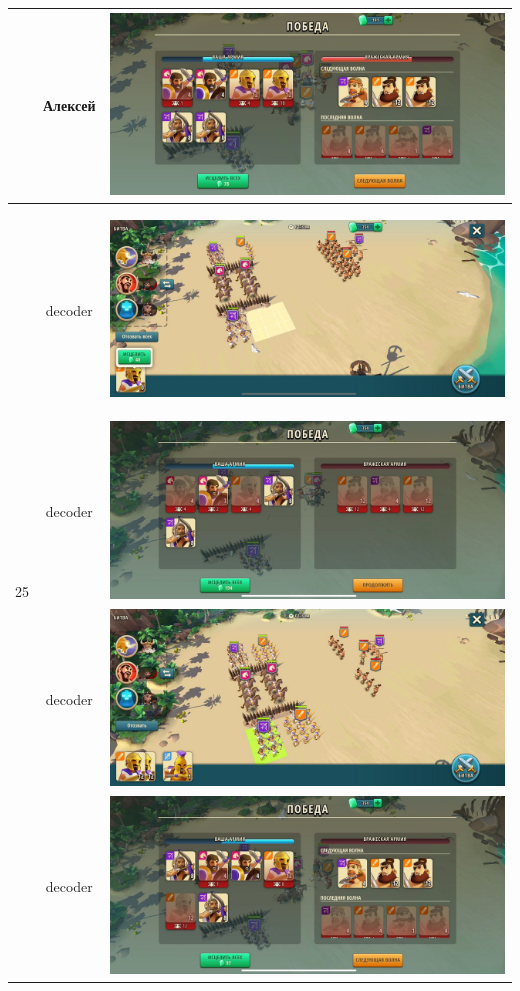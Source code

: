 \begin{longtable}{|c|c|c|}
	& Алексей &
	\includegraphics[width=0.75\linewidth]{./parts/media/TreasureHunt/25/alexey/photo_2022-04-07_10-09-08.jpg} \\
	\hline
	\multirow{11}{*}{25} & decoder &
	\hypertarget{fight25}{\includegraphics[width=0.75\linewidth]{./parts/media/TreasureHunt/25/decoder/photo_2022-04-13_16-38-53.jpg}} \\
	& decoder &
	\includegraphics[width=0.75\linewidth]{./parts/media/TreasureHunt/25/decoder/photo_2022-04-13_16-38-58.jpg} \\
	& decoder &
	\includegraphics[width=0.75\linewidth]{./parts/media/TreasureHunt/25/decoder/photo_2022-04-13_16-38-30.jpg} \\
	& decoder &
	\includegraphics[width=0.75\linewidth]{./parts/media/TreasureHunt/25/decoder/photo_2022-04-13_16-38-45.jpg} \\

\end{longtable}
